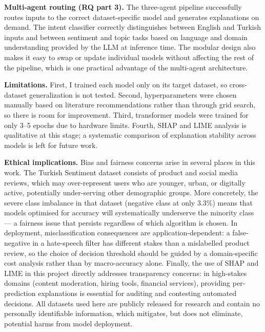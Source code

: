 \documentclass[conference]{IEEEtran}
\begin{document}
\textbf{Multi-agent routing (RQ part 3).} The three-agent pipeline successfully routes
inputs to the correct dataset-specific model and generates explanations on demand. The
intent classifier correctly distinguishes between English and Turkish inputs and between
sentiment and topic tasks based on language and domain understanding provided by the LLM at inference time. The modular design
also makes it easy to swap or update individual models without affecting the rest of the
pipeline, which is one practical advantage of the multi-agent architecture.

\textbf{Limitations.} First, I trained each model only on its target dataset, so
cross-dataset generalization is not tested. Second, hyperparameters were chosen manually
based on literature recommendations rather than through grid search, so there is room for
improvement. Third, transformer models were trained for only 3--5 epochs due to hardware
limits. Fourth, SHAP and LIME analysis is qualitative at this stage; a systematic
comparison of explanation stability across models is left for future work.

\textbf{Ethical implications.} Bias and fairness concerns arise in several places in this
work. The Turkish Sentiment dataset consists of product and social media reviews, which
may over-represent users who are younger, urban, or digitally active, potentially
under-serving other demographic groups. More concretely, the severe class imbalance in that
dataset (negative class at only 3.3\%) means that models optimised for accuracy will
systematically underserve the minority class --- a fairness issue that persists regardless
of which algorithm is chosen. In deployment, misclassification consequences are
application-dependent: a false-negative in a hate-speech filter has different stakes than a
mislabelled product review, so the choice of decision threshold should be guided by a
domain-specific cost analysis rather than by macro-accuracy alone. Finally, the use of SHAP
and LIME in this project directly addresses transparency concerns: in high-stakes domains
(content moderation, hiring tools, financial services), providing per-prediction explanations
is essential for auditing and contesting automated decisions. All datasets used here are
publicly released for research and contain no personally identifiable information, which
mitigates, but does not eliminate, potential harms from model deployment.
\end{document}
